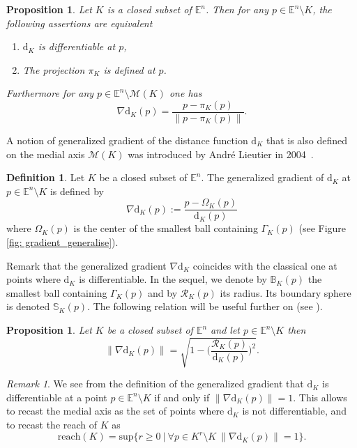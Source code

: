 \documentclass[11pt,reqno,a4paper]{article}%
\newtheorem{proposition}[theorem]{Proposition}
\theoremstyle{definition}
\newtheorem{definition}{Definition}[section]
\theoremstyle{remark}
\newtheorem{remark}{Remark}[section]
\renewcommand{\geq}{\geqslant}
\renewcommand{\d}{\mathrm{d}}
\newcommand{\Medial}{\mathscr{M}}
\newcommand{\E}{\mathbb{E}}
\newcommand{\reach}{\mathrm{reach}} %
\renewcommand{\d}{\mathrm{d}}
\begin{document}
\begin{proposition} \label{prop: distance_differentiable}
Let $K$ is a closed subset of $\E^n$. Then for any $p \in \E^n \setminus K$, the following assertions are equivalent  
\begin{enumerate}
    \item $\d_K$ is differentiable at $p$,
    \item The projection $\pi_K$ is defined at $p$.
\end{enumerate}
Furthermore for any $p\in \E^n \setminus \Medial(K)$ one has
$$\nabla \d_K (p) = \frac{p - \pi_K(p)}{\|p - \pi_K(p)\|}.$$
\end{proposition}
A notion of generalized gradient of the distance function $\d_K$ that is also defined on the medial axis $\Medial(K)$ was introduced by André Lieutier in 2004~\cite{LIEUTIER20041029}.
\begin{definition} \label{def: gradient_generalise}
Let $K$ be a closed subset of $\E^n$. 
The generalized gradient of $\d_K$ at  $p \in \E^n \setminus K$ is defined by
$$\nabla \d_K (p) := \frac{p - \Omega_K(p)}{\d_K(p)}$$
where $\Omega_K(p)$ is the center of the smallest ball containing $\Gamma_K(p)$ (see Figure \ref{fig: gradient_generalise}).
\end{definition}
Remark that the generalized gradient $\nabla \d_K$ coincides with the classical one at points where $\d_K$ is differentiable.  In the sequel, we denote by $\mathbb{B}_K(p)$ the smallest ball containing $\Gamma_K(p)$ and by $\mathscr{R}_K(p)$ its radius. Its boundary sphere is denoted $\mathbb{S}_K(p)$.
The following relation will be useful further on (see \cite{LIEUTIER20041029}).
\begin{proposition} \label{prop: expression_grad_g_rayon}
Let $K$ be a closed subset of $\E^n$ and let $p \in \E^n \setminus K$ then
$$ \| \nabla \d_K (p) \| = \sqrt{ 1 - \bigg( \frac{\mathscr{R}_K(p)}{\d_K(p)} \bigg)^2} .$$
\end{proposition}

\begin{remark}\label{rem:reachrecast} We see from the definition of the generalized gradient that $\d_K$ is differentiable at a point $p \in \E^n \setminus K$ if and only if $\| \nabla \d_K(p) \| = 1$. This allows to recast the medial axis as the set of points where $\d_K$ is not differentiable, and to recast the reach of $K$ as
$$
\reach(K) = \text{sup} \{ r\geq 0 ~ \vert ~ \forall p\in K^r\setminus K  ~\|\nabla \d_K(p)\| =1\}.
$$
\end{remark}
\end{document}
